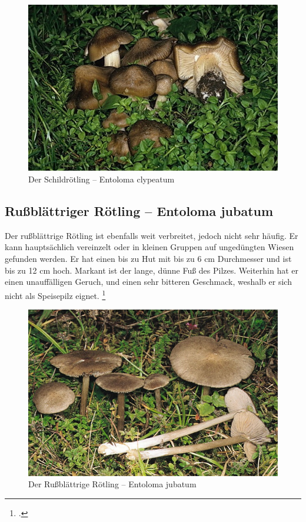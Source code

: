 \documentclass[a4paper,abstracton]{scrreprt}
\begin{document}
\begin{figure}[H]
\centering
\includegraphics[scale=12]{schildroetling}
\caption{Der Schildrötling -- Entoloma clypeatum }
\label{fig:schildroetling}
\end{figure}

\subsection{Rußblättriger Rötling -- Entoloma jubatum}
Der rußblättrige Rötling ist ebenfalls weit verbreitet, jedoch nicht sehr häufig. Er kann hauptsächlich vereinzelt oder in kleinen Gruppen auf ungedüngten Wiesen gefunden werden. Er hat einen bis zu Hut mit bis zu 6 cm Durchmesser und ist bis zu 12 cm hoch. Markant ist der lange, dünne Fuß des Pilzes. Weiterhin hat er einen unauffälligen Geruch, und einen sehr bitteren Geschmack, weshalb er sich nicht als Speisepilz eignet.
\footcite{russblaettrig}
\begin{figure}[H]
\centering
\includegraphics[scale=0.3]{russblaettrig}
\caption{Der Rußblättrige Rötling -- Entoloma jubatum }
\label{fig:russblaettrig}
\end{figure}
\end{document}
